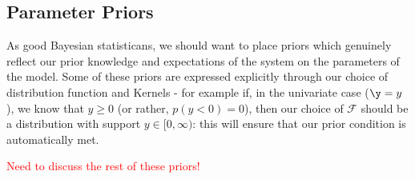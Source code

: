        
    \subsection{Parameter Priors}

        As good Bayesian statisticans, we should want to place priors which genuinely reflect our prior knowledge and expectations of the system on the parameters of the model. Some of these priors are expressed explicitly through our choice of distribution function and Kernels - for example if, in the univariate case ($\y = y$), we know that $y \geq 0$ (or rather, $p(y <0) = 0$), then our choice of $\mathcal{F}$ should be a distribution with support $y \in [0,\infty)$: this will ensure that our prior condition is automatically met.

        \textcolor{red}{Need to discuss the rest of these priors!}

